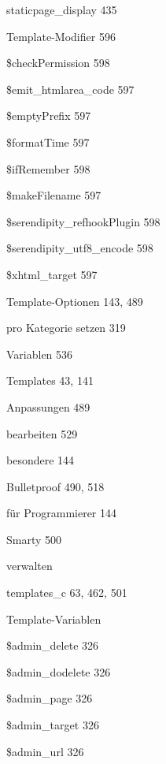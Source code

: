 \documentclass{book}
\renewcommand\subitem{\par}
\begin{document}
\begin{multicols}{2}
\begin{osp-index}
    \subitem staticpage\_display\hspace{1mm} 435
  \item Template-Modifier\hspace{1mm} 596
    \subitem \$checkPermission\hspace{1mm} 598
    \subitem \$emit\_htmlarea\_code\hspace{1mm} 597
    \subitem \$emptyPrefix\hspace{1mm} 597
    \subitem \$formatTime\hspace{1mm} 597
    \subitem \$ifRemember\hspace{1mm} 598
    \subitem \$makeFilename\hspace{1mm} 597
    \subitem \$serendipity\_refhookPlugin\hspace{1mm} 598
    \subitem \$serendipity\_utf8\_encode\hspace{1mm} 598
    \subitem \$xhtml\_target\hspace{1mm} 597
  \item Template-Optionen\hspace{1mm} 143, 489
    \subitem pro Kategorie setzen\hspace{1mm} 319
    \subitem Variablen\hspace{1mm} 536
  \item Templates\hspace{1mm} 43, 141
    \subitem Anpassungen\hspace{1mm} 489
    \subitem bearbeiten\hspace{1mm} 529
    \subitem besondere\hspace{1mm} 144
    \subitem Bulletproof\hspace{1mm} 490, 518
    \subitem f\"ur Programmierer\hspace{1mm} 144
    \subitem Smarty\hspace{1mm} 500
    \subitem verwalten\hspace{1mm} 
  \item templates\_c\hspace{1mm} 63, 462, 501
  \item Template-Variablen
    \subitem \$admin\_delete\hspace{1mm} 326
    \subitem \$admin\_dodelete\hspace{1mm} 326
    \subitem \$admin\_page\hspace{1mm} 326
    \subitem \$admin\_target\hspace{1mm} 326
    \subitem \$admin\_url\hspace{1mm} 326

\end{osp-index}
\end{multicols}
\end{document}
